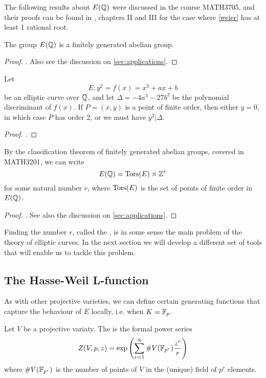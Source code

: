 \documentclass[12pt, a4paper]{amsart}
\begin{document}
The following results about $E({\mathbb Q})$ were discussed in the course MATH3705,
and their proofs can be found in \cite{rational}, chapters II and III for the
case where \autoref{weier} has at least 1 rational root.

\begin{thm}
  The group $E({\mathbb Q})$ is a finitely generated abelian group.
\end{thm}  
\begin{proof}
  \cite[See][Chapter III, pages 63-88]{rational}. Also see the discussion on
  \autoref{sec:applications}.
\end{proof}

\begin{thm} \label{thm:nagelllutz}
  Let
  \[E: y^2 = f(x) = x^3 + ax + b\]
  be an elliptic curve over ${\mathbb Q}$, and let $\Delta = -4a^3 -27b^2$ be the
  polynomial discriminant of $f(x)$. If $P = (x,y)$ is a point of finite order,
  then either $y = 0$, in which case $P$ has order 2, or we must have $y^2 | \Delta$.
\end{thm}
\begin{proof}
  \cite[See][Chapter II, pages 49-56]{rational}.
\end{proof}

By the classification theorem of finitely generated abelian groups, covered in
MATH3201, we can write
\[E({\mathbb Q}) = {\text{Tors}}(E) \times {\mathbb Z}^r\]
for some natural number $r$, where ${\text{Tors}}(E)$ is the set of points of finite
order in $E({\mathbb Q})$.

\begin{proof}
  \cite[See][Chapter III, pages 63-88]{rational}. See also the discussion on
  \autoref{sec:applications}.
\end{proof}

Finding the number $r$, called the , is in some sense the
main problem of the theory of elliptic curves. In the next section we will
develop a different set of tools that will enable us to tackle this problem.

\subsection{The Hasse-Weil L-function}

As with other projective varieties, we can define certain generating functions
that capture the behaviour of $E$ locally, i.e. when $K = \mathbb{F}_p$.

\begin{defn}
  Let $V$ be a projective variaty.
  The  is the formal power series
  \[Z(V, p, z) = \exp \left( \sum\limits_{r=1}^{\infty} \# V(\mathbb{F}_{p^r}) \frac{z^r}{r} \right)\]
  where $\# V(\mathbb{F}_{p^r})$ is the number of points of $V$ in the (unique) field
  of $p^r$ elements.
\end{defn}
\end{document}

